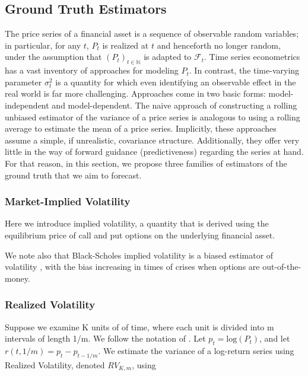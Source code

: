 \documentclass[11pt]{article}
\def\mc#1{\mathcal{#1}} %
\def\mc#1{\mathcal{#1}}
\theoremstyle{definition}
\begin{document}
\subsection{Ground Truth Estimators}
\label{Ground Truth Estimators}

The price series of a financial asset is a sequence of observable random variables; in particular, for any $t$, $P_{t}$ is realized at $t$ and henceforth no longer random, under the assumption that $(P_{t})_{t\in\mathbb{N}}$ is adapted to $\mc{F}_{t}$.  Time series econometrics has a vast inventory of approaches for modeling $P_{t}$.  In contrast, the time-varying parameter $\sigma^{2}_{t}$ is a quantity for which even identifying an observable effect in the real world is far more challenging.  Approaches come in two basic forms: model-independent and model-dependent.  The naive approach of constructing a rolling unbiased estimator of the variance of a price series is analogous to using a rolling average to estimate the mean of a price series.  Implicitly, these approaches assume a simple, if unrealistic, covariance structure.  Additionally, they offer very little in the way of forward guidance (predictiveness) regarding the series at hand.  For that reason, in this section, we propose three families of estimators of the ground truth that we aim to forecast.

\subsubsection{Market-Implied Volatility}

Here we introduce implied volatility, a quantity that is derived using the equilibrium price of call and put options on the underlying financial asset.

We note also that Black-Scholes implied volatility is a biased estimator of volatility \citep{mayhew1995implied, christensen1998relation}, with the bias increasing in times of crises when options are out-of-the-money.


\subsubsection{Realized Volatility}

Suppose we examine K units of of time, where each unit is divided into m intervals of length 1/m.  We follow the notation of  \citet{andersen2009realized}. Let $p_{t} = \text{log}(P_{t})$, and let $r(t, 1/m) = p_{t} - p_{t-1/m}$.  We estimate the variance of a log-return series using Realized Volatility, denoted $RV_{K,m}$, using
\end{document}
